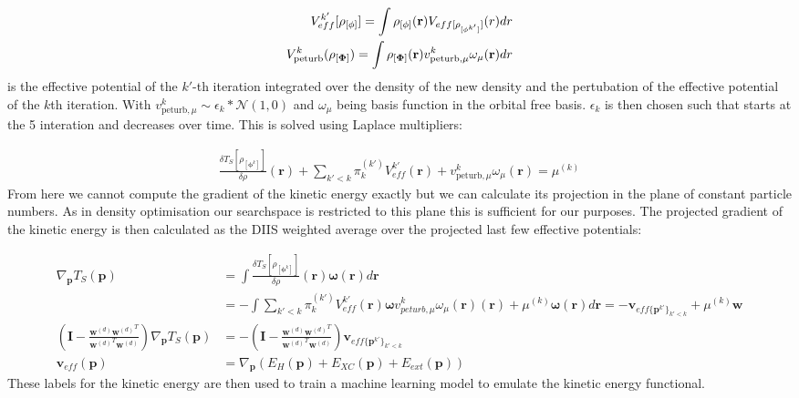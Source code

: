 \begin{align}
    V_{eff}^{k'}[\rho_{[\mathbf{\phi}]}] = \int \rho_{[\mathbf{\phi}]}(\mathbf{r}) V_{eff[\rho_{[\mathbf{\phi}^{k'}]}]}(r)dr\\
    V_\text{peturb}^{k}(\rho_{[\mathbf{\Phi}]}) = \int \rho_{[\mathbf{\Phi}]}(\mathbf{r}) v_{\text{peturb},\mu}^{k}\omega_\mu(\mathbf{r})dr
\end{align}
is the effective potential of the $k'$-th iteration integrated over the density of the new density and the pertubation of the effective potential of the $k$th iteration. With $v_{\text{peturb},\mu}^{k} \sim \epsilon_k * \mathcal{N}(1,0)$ and $\omega_\mu$ being basis function in the orbital free basis.
$\epsilon_k$ is then chosen such that starts at the 5 interation and decreases over time.
This is solved using Laplace multipliers:

\begin{align}
    \frac{\delta T_S[\rho_{[\mathbf{\phi}^{k}]}]}{\delta \rho}(\mathbf{r}) + \sum_{k'<k} \pi^{(k')}_k V_{eff}^{k'}(\mathbf{r}) + v_{\text{peturb},\mu}^{k}\omega_\mu(\mathbf{r})= \mu^{(k)}
\end{align}
From here we cannot compute the gradient of the kinetic energy exactly but we can calculate its projection in the plane of constant particle numbers. As in density optimisation our searchspace is restricted to this plane this is sufficient for our purposes.
The projected gradient of the kinetic energy is then calculated as the DIIS weighted average over the projected last few effective potentials:

\begin{align}
    \nabla_\mathbf{p} T_S(\mathbf{p}) &= \int \frac{\delta T_S[\rho_{[\mathbf{\phi}^{k}]}]}{\delta \rho}(\mathbf{r}) \mathbf{\omega}(\mathbf{r}) d\mathbf{r} \\
    &= -\int\sum_{k'<k} \pi^{(k')}_k V_{eff}^{k'}(\mathbf{r}) \mathbf{\omega}v_{peturb,\mu}^{k}\omega_\mu(\mathbf{r})(\mathbf{r}) +\mu^{(k)}\mathbf{\omega}(\mathbf{r})d\mathbf{r} = -{\mathbf{v}}_{eff\{\mathbf{p}^{k'}\}_{k'< k}}+\mu^{(k)}\mathbf{w}\\
    \left( \textbf{I}-\frac{\textbf{w}^{(d)}{\textbf{w}^{(d)}}^T}{{\textbf{w}^{(d)}}^T
        \textbf{w}^{(d)}}\right) \nabla_\mathbf{p} T_S(\mathbf{p}) &= -\left( \textbf{I}-\frac{\textbf{w}^{(d)}{\textbf{w}^{(d)}}^T}{{\textbf{w}^{(d)}}^T
        \textbf{w}^{(d)}}\right){\mathbf{v}}_{eff\{\mathbf{p}^{k'}\}_{k'< k}}\\
    \mathbf{v}_{eff}(\mathbf{p}) &= \nabla_\mathbf{p} (E_{H}(\mathbf{p}) + E_{XC}(\mathbf{p}) + E_{ext}(\mathbf{p}))
\end{align}
These labels for the kinetic energy are then used to train a machine learning model to emulate the kinetic energy functional.\\

